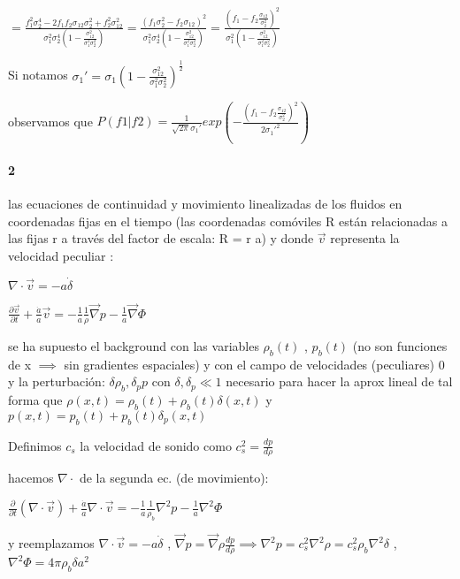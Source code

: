 \documentclass[12pt]{book}
\begin{document}
$= \frac{f_1^2 \sigma_2^4  - 2 f_1 f_2 \sigma_{12} \sigma_2^2   + f_2^2 \sigma_{12}^2 }
{\sigma_1^2 \sigma_2^4(1- \frac{\sigma_{12}^2}{\sigma_1^2 \sigma_2^2 })}
= \frac{(f_1 \sigma_2^2  - f_2 \sigma_{12} )^2}
{\sigma_1^2 \sigma_2^4(1- \frac{\sigma_{12}^2}{\sigma_1^2 \sigma_2^2 })}
= \frac{(f_1  - f_2 \frac{\sigma_{12}}{\sigma_2^2} )^2}
{\sigma_1^2 (1- \frac{\sigma_{12}^2}{\sigma_1^2 \sigma_2^2 })}
$

Si notamos $\sigma_1' = \sigma_1(1- \frac{\sigma_{12}^2}{\sigma_1^2 \sigma_2^2 })^{\frac{1}{2}}$

observamos que 
$P(f1|f2) = \frac{1}{\sqrt{2\pi}\sigma_1'} 
exp(-\frac{(f_1  - f_2 \frac{\sigma_{12}}{\sigma_2^2} )^2}{2 \sigma_1'^2 })$


\paragraph{2}

las ecuaciones de continuidad y movimiento linealizadas de los fluidos en coordenadas fijas en el tiempo (las coordenadas
comóviles R están relacionadas a las fijas r a través del factor de escala: R = r a) y donde  $\vec{v}$ representa la velocidad peculiar :

$\nabla \cdot \vec{v} = -a \dot{\delta}$

$\frac{\partial \vec{v}}{\partial t} + \frac{\dot{a}}{a} \vec{v} = -\frac{1}{a} \frac{1}{\rho} \vec\nabla{p} - \frac{1}{a} \vec{\nabla}\Phi$

se ha supuesto el background con las variables $\rho_b(t)$ , $p_b(t)$ (no son funciones de x $\implies $ 
sin gradientes espaciales) y con el campo de velocidades (peculiares) 0
y la perturbación: $\delta \rho_b, \delta_p p$ con $\delta, \delta_p \ll 1$ 
necesario para hacer la aprox lineal de tal forma que $\rho(x,t) = \rho_b(t) + \rho_b(t) \delta(x,t)$ y 
$p(x,t) = p_b(t) + p_b(t) \delta_p(x,t)$ 

Definimos $c_s$ la velocidad de sonido  como $c_s^2 = \frac{dp}{d\rho}$

hacemos $\nabla \cdot $ de la segunda ec. (de movimiento):

$\frac{\partial }{\partial t} (\nabla \cdot \vec{v})+ \frac{\dot{a}}{a} \nabla \cdot \vec{v} = -\frac{1}{a} \frac{1}{\rho_b} \nabla^2{p} - \frac{1}{a} {\nabla}^2\Phi$

y reemplazamos $\nabla \cdot \vec{v} = -a \dot{\delta} $ ,  
$ \vec{\nabla}{p} = \vec{\nabla}{\rho}\frac{dp}{d\rho} \implies \nabla^2{p} = c_s^2 \nabla^2{\rho} = c_s^2 \rho_b \nabla^2 \delta$  , 
$\nabla^2 \Phi = 4 \pi \rho_b \delta a^2$ 
\end{document}

